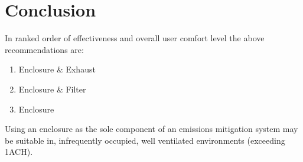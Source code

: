\documentclass[11pt]{article}
\begin{document}
\section{Conclusion}
\label{sec:org828708e}
In ranked order of effectiveness and overall user comfort level the above recommendations are:
\begin{enumerate}
\item Enclosure \& Exhaust
\item Enclosure \& Filter
\item Enclosure
\end{enumerate}
Using an enclosure as the sole component of an emissions mitigation system may be suitable in, infrequently occupied, well ventilated environments (exceeding 1ACH). 
\end{document}
